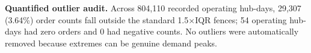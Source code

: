 \textbf{Quantified outlier audit.} Across 804,110 recorded operating hub-days, 29,307 (3.64\%) order counts fall outside the standard 1.5$\times$IQR fences; 54 operating hub-days had zero orders and 0 had negative counts. No outliers were automatically removed because extremes can be genuine demand peaks.
